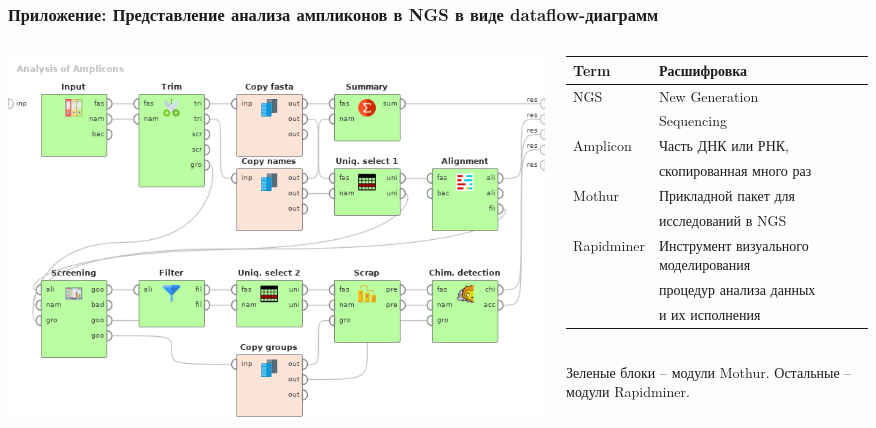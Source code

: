 \documentclass[10pt]{beamer}
\begin{document}
\begin{frame} \frametitle{Приложение: Представление анализа ампликонов в NGS в виде dataflow-диаграмм} \begin{columns} \begin{column}{0.6\textwidth} \begin{raggedright} \includegraphics[width=1\linewidth]{Dataflow-color-en.png} \end{raggedright} \end{column} \begin{column}{0.4\textwidth}\footnotesize \begin{tabular}{ll} Term &Расшифровка\\ \hline

NGS &New Generation\\ &Sequencing\\ Amplicon &Часть ДНК или РНК,\\ &скопированная много раз\\ Mothur &Прикладной пакет для\\ &исследований в NGS\\ Rapidminer &Инструмент визуального моделирования \\ &процедур анализа данных\\ &и их исполнения \end{tabular} ${}$\\[1em] Зеленые блоки -- модули Mothur. Остальные -- модули Rapidminer. \end{column} \end{columns} \end{frame}
\end{document}
